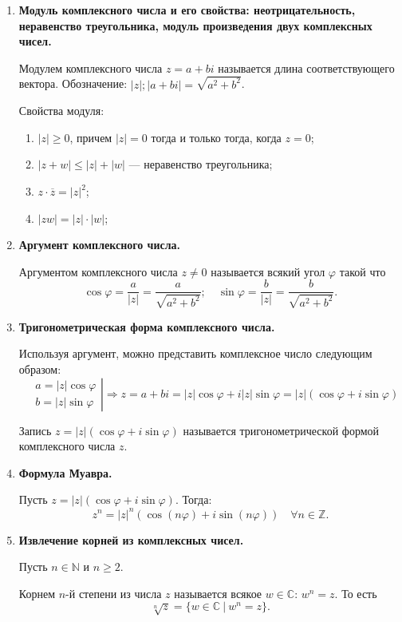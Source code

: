 \begin{enumerate}
\item \textbf{Модуль комплексного числа и его свойства: неотрицательность, неравенство треугольника, модуль произведения двух комплексных чисел.}

Модулем комплексного числа $z = a + bi$ называется длина соответствующего вектора. Обозначение: $|z|; |a+bi| = \sqrt{a^2 + b^2}$.

Свойства модуля:
\begin{enumerate}
\item $|z| \geqslant 0$, причем $|z| = 0$ тогда и только тогда, когда $z = 0$;
\item $|z + w| \leqslant |z| + |w|$ — неравенство треугольника;
\item $z\cdot\overline{z} = |z|^2$;
\item $|zw| = |z| \cdot |w|$;
\end{enumerate}
\item \textbf{Аргумент комплексного числа.}

Аргументом комплексного числа $z \neq 0$  называется всякий угол $\varphi$ такой что 
\[
\cos \varphi = \frac{a}{|z|} = \frac{a}{\sqrt{a^2 + b^2}}; \quad \sin \varphi = \frac{b}{|z|} = \frac{b}{\sqrt{a^2 + b^2}}.
\]
\item \textbf{Тригонометрическая форма комплексного числа.}

Используя аргумент, можно представить комплексное число следующим образом:
\[
\left.
\begin{aligned}
&a = |z|\cos \varphi \\
&b = |z|\sin \varphi
\end{aligned} 
\right| \Rightarrow z = a + bi = |z| \cos \varphi + i |z| \sin \varphi = |z|(\cos\varphi + i\sin\varphi)
\] 

Запись $z = |z|(\cos\varphi + i\sin\varphi)$ называется тригонометрической формой \\ комплексного числа $z$.

\item \textbf{Формула Муавра.}

Пусть $z = |z|\left(\cos\varphi + i \sin \varphi\right)$. Тогда:
\[z^n = |z|^n\left(\cos\left(n\varphi\right)+i\sin\left(n\varphi\right)\right) \quad \forall n \in \mathbb{Z}.
\]

\item \textbf{Извлечение корней из комплексных чисел.}

Пусть $n\in\mathbb N$ и $n\geqslant2$.

Корнем $n$-й степени из числа $z$ называется всякое $w\in\mathbb C$: $w^n=z$. То есть
\[
\sqrt[n]{z} = \{w\in\mathbb C\ |\ w^n = z\}.
\]


\end{enumerate}
